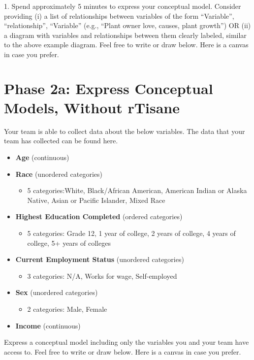 1. Spend approximately 5 minutes to express your conceptual model. Consider
providing (i) a list of relationships between variables of the form ``Variable'',
``relationship'', ``Variable'' (e.g., ``Plant owner love, causes, plant growth'') OR
(ii) a diagram with variables and relationships between them clearly labeled,
similar to the above example diagram. Feel free to write or draw below. Here is
a canvas in case you prefer. 
\clearpage

\section{Phase 2a: Express Conceptual Models, Without rTisane}
Your team is able to collect data about the below variables. The data that your team has collected can be found here. 
\begin{itemize}
    \item \textbf{Age} (continuous)
    \item \textbf{Race} (unordered categories)
    \begin{itemize}
        \item 5 categories:White, Black/African American, American Indian or Alaska Native, Asian or Pacific Islander, Mixed Race
    \end{itemize}
    \item \textbf{Highest Education Completed} (ordered categories)
    \begin{itemize}
        \item 5 categories: Grade 12, 1 year of college, 2 years of college, 4 years of college, 5+ years of colleges
    \end{itemize}
    \item \textbf{Current Employment Status} (unordered categories)
	\begin{itemize}
        \item 3 categories: N/A, Works for wage, Self-employed
    \end{itemize}
    \item \textbf{Sex} (unordered categories)
    \begin{itemize}
        \item 2 categories: Male, Female
    \end{itemize}
    \item \textbf{Income} (continuous)
\end{itemize}

Express a conceptual model including only the variables you and your team have
access to. Feel free to write or draw below. Here is a canvas in case you
prefer. 
\clearpage

